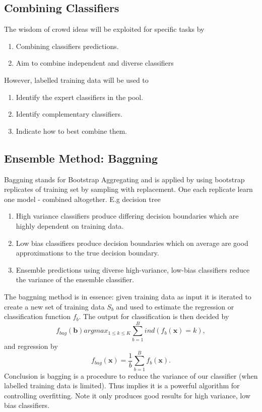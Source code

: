 \documentclass[12pt]{article}
\numberwithin{equation}{section}
\begin{document}
\subsection{Combining Classifiers}
The wisdom of crowd ideas will be exploited for specific tasks by 
\begin{enumerate}
\item
Combining classifiers predictions.
\item
Aim to combine independent and diverse classifiers

\end{enumerate}

However, labelled training data will be used to
\begin{enumerate}
\item
Identify the expert classifiers in the pool.
\item
Identify complementary classifiers.
\item
Indicate how to best combine them.
\end{enumerate}
\subsection{Ensemble Method: Baggning}
Baggning stands for Bootstrap Aggregating and is applied by using bootstrap replicates of training set by sampling with replacement. One each replicate learn one model - combined altogether. E.g decision tree 
\begin{enumerate}
\item
High variance classifiers produce differing decision boundaries which are highly dependent on training data.
\item Low bias classifiers produce decision boundaries which on average are good approximations to the true decision boundary.
\item Ensemble predictions using diverse high-variance, low-bias classifiers reduce the variance of the ensemble classifier. 
\end{enumerate}
The baggning method is in essence: given training data as input it is iterated to create a new set of training data $S_{b}$ and used to estimate the regression or classification function $f_{b}$. The output for classification is then decided by
\begin{equation}
f_{bag}(\bm{b}) argmax_{1\leq k \leq K} \sum_{b=1}^{B} ind(f_{b}(\bm{x})= k),
\end{equation}
and regression by
\begin{equation}
f_{bag}(\bm{x}) = \frac{1}{b} \sum_{b=1}^{B} f_{b}(\bm{x}).
\end{equation}
Conclusion is bagging is a procedure to reduce the variance of our classifier (when labelled training data is limited). Thus implies it is a powerful algorithm for controlling overfitting. Note it only produces good results for high variance, low bias classifiers.
\end{document}
